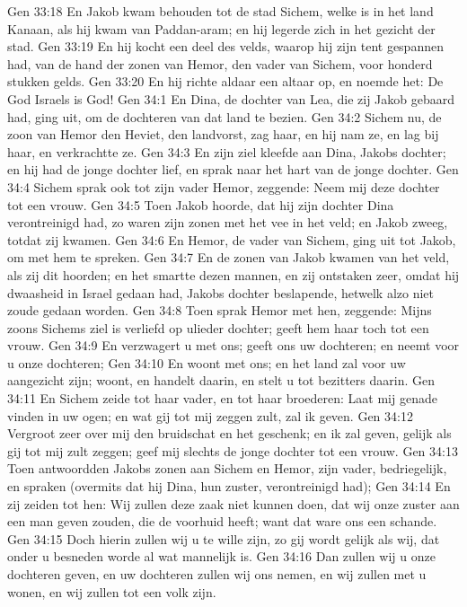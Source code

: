 Gen 33:18  En Jakob kwam behouden tot de stad Sichem, welke is in het land Kanaan, als hij kwam van Paddan-aram; en hij legerde zich in het gezicht der stad.
Gen 33:19  En hij kocht een deel des velds, waarop hij zijn tent gespannen had, van de hand der zonen van Hemor, den vader van Sichem, voor honderd stukken gelds.
Gen 33:20  En hij richte aldaar een altaar op, en noemde het: De God Israels is God!
Gen 34:1  En Dina, de dochter van Lea, die zij Jakob gebaard had, ging uit, om de dochteren van dat land te bezien.
Gen 34:2  Sichem nu, de zoon van Hemor den Heviet, den landvorst, zag haar, en hij nam ze, en lag bij haar, en verkrachtte ze.
Gen 34:3  En zijn ziel kleefde aan Dina, Jakobs dochter; en hij had de jonge dochter lief, en sprak naar het hart van de jonge dochter.
Gen 34:4  Sichem sprak ook tot zijn vader Hemor, zeggende: Neem mij deze dochter tot een vrouw.
Gen 34:5  Toen Jakob hoorde, dat hij zijn dochter Dina verontreinigd had, zo waren zijn zonen met het vee in het veld; en Jakob zweeg, totdat zij kwamen.
Gen 34:6  En Hemor, de vader van Sichem, ging uit tot Jakob, om met hem te spreken.
Gen 34:7  En de zonen van Jakob kwamen van het veld, als zij dit hoorden; en het smartte dezen mannen, en zij ontstaken zeer, omdat hij dwaasheid in Israel gedaan had, Jakobs dochter beslapende, hetwelk alzo niet zoude gedaan worden.
Gen 34:8  Toen sprak Hemor met hen, zeggende: Mijns zoons Sichems ziel is verliefd op ulieder dochter; geeft hem haar toch tot een vrouw.
Gen 34:9  En verzwagert u met ons; geeft ons uw dochteren; en neemt voor u onze dochteren;
Gen 34:10  En woont met ons; en het land zal voor uw aangezicht zijn; woont, en handelt daarin, en stelt u tot bezitters daarin.
Gen 34:11  En Sichem zeide tot haar vader, en tot haar broederen: Laat mij genade vinden in uw ogen; en wat gij tot mij zeggen zult, zal ik geven.
Gen 34:12  Vergroot zeer over mij den bruidschat en het geschenk; en ik zal geven, gelijk als gij tot mij zult zeggen; geef mij slechts de jonge dochter tot een vrouw.
Gen 34:13  Toen antwoordden Jakobs zonen aan Sichem en Hemor, zijn vader, bedriegelijk, en spraken (overmits dat hij Dina, hun zuster, verontreinigd had);
Gen 34:14  En zij zeiden tot hen: Wij zullen deze zaak niet kunnen doen, dat wij onze zuster aan een man geven zouden, die de voorhuid heeft; want dat ware ons een schande.
Gen 34:15  Doch hierin zullen wij u te wille zijn, zo gij wordt gelijk als wij, dat onder u besneden worde al wat mannelijk is.
Gen 34:16  Dan zullen wij u onze dochteren geven, en uw dochteren zullen wij ons nemen, en wij zullen met u wonen, en wij zullen tot een volk zijn.
